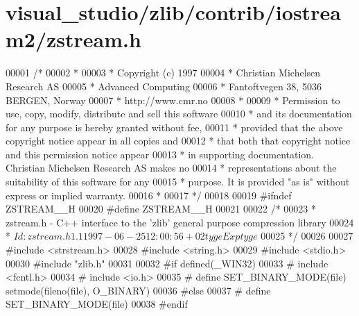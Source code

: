 \hypertarget{visual__studio_2zlib_2contrib_2iostream2_2zstream_8h_source}{}\section{visual\+\_\+studio/zlib/contrib/iostream2/zstream.h}
\label{visual__studio_2zlib_2contrib_2iostream2_2zstream_8h_source}

\begin{DoxyCode}
00001 \textcolor{comment}{/*}
00002 \textcolor{comment}{ *}
00003 \textcolor{comment}{ * Copyright (c) 1997}
00004 \textcolor{comment}{ * Christian Michelsen Research AS}
00005 \textcolor{comment}{ * Advanced Computing}
00006 \textcolor{comment}{ * Fantoftvegen 38, 5036 BERGEN, Norway}
00007 \textcolor{comment}{ * http://www.cmr.no}
00008 \textcolor{comment}{ *}
00009 \textcolor{comment}{ * Permission to use, copy, modify, distribute and sell this software}
00010 \textcolor{comment}{ * and its documentation for any purpose is hereby granted without fee,}
00011 \textcolor{comment}{ * provided that the above copyright notice appear in all copies and}
00012 \textcolor{comment}{ * that both that copyright notice and this permission notice appear}
00013 \textcolor{comment}{ * in supporting documentation.  Christian Michelsen Research AS makes no}
00014 \textcolor{comment}{ * representations about the suitability of this software for any}
00015 \textcolor{comment}{ * purpose.  It is provided "as is" without express or implied warranty.}
00016 \textcolor{comment}{ *}
00017 \textcolor{comment}{ */}
00018 
00019 \textcolor{preprocessor}{#ifndef ZSTREAM\_\_H}
00020 \textcolor{preprocessor}{#define ZSTREAM\_\_H}
00021 
00022 \textcolor{comment}{/*}
00023 \textcolor{comment}{ * zstream.h - C++ interface to the 'zlib' general purpose compression library}
00024 \textcolor{comment}{ * $Id: zstream.h 1.1 1997-06-25 12:00:56+02 tyge Exp tyge $}
00025 \textcolor{comment}{ */}
00026 
00027 \textcolor{preprocessor}{#include <strstream.h>}
00028 \textcolor{preprocessor}{#include <string.h>}
00029 \textcolor{preprocessor}{#include <stdio.h>}
00030 \textcolor{preprocessor}{#include "zlib.h"}
00031 
00032 \textcolor{preprocessor}{#if defined(\_WIN32)}
00033 \textcolor{preprocessor}{#   include <fcntl.h>}
00034 \textcolor{preprocessor}{#   include <io.h>}
00035 \textcolor{preprocessor}{#   define SET\_BINARY\_MODE(file) setmode(fileno(file), O\_BINARY)}
00036 \textcolor{preprocessor}{#else}
00037 \textcolor{preprocessor}{#   define SET\_BINARY\_MODE(file)}
00038 \textcolor{preprocessor}{#endif}

\end{DoxyCode}
